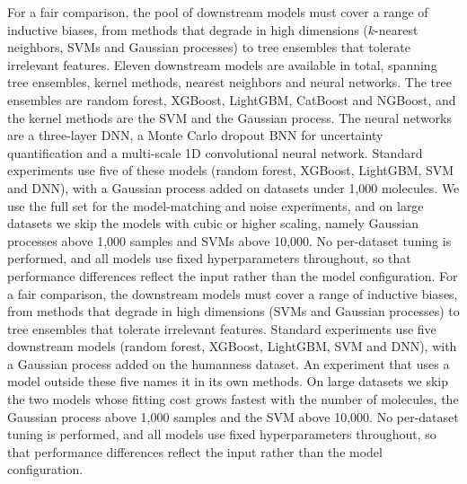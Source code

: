 For a fair comparison, the pool of downstream models must cover a range of inductive biases, from methods that degrade in high dimensions ($k$-nearest neighbors, SVMs and Gaussian processes) to tree ensembles that tolerate irrelevant features. Eleven downstream models are available in total, spanning tree ensembles, kernel methods, nearest neighbors and neural networks. The tree ensembles are random forest, XGBoost, LightGBM, CatBoost and NGBoost, and the kernel methods are the SVM and the Gaussian process. The neural networks are a three-layer DNN, a Monte Carlo dropout BNN for uncertainty quantification and a multi-scale 1D convolutional neural network. Standard experiments use five of these models (random forest, XGBoost, LightGBM, SVM and DNN), with a Gaussian process added on datasets under 1,000 molecules. We use the full set for the model-matching and noise experiments, and on large datasets we skip the models with cubic or higher scaling, namely Gaussian processes above 1,000 samples and SVMs above 10,000. No per-dataset tuning is performed, and all models use fixed hyperparameters throughout, so that performance differences reflect the input rather than the model configuration.
For a fair comparison, the downstream models must cover a range of inductive biases, from methods that degrade in high dimensions (SVMs and Gaussian processes) to tree ensembles that tolerate irrelevant features. Standard experiments use five downstream models (random forest, XGBoost, LightGBM, SVM and DNN), with a Gaussian process added on the humanness dataset. An experiment that uses a model outside these five names it in its own methods. On large datasets we skip the two models whose fitting cost grows fastest with the number of molecules, the Gaussian process above 1,000 samples and the SVM above 10,000. No per-dataset tuning is performed, and all models use fixed hyperparameters throughout, so that performance differences reflect the input rather than the model configuration.

